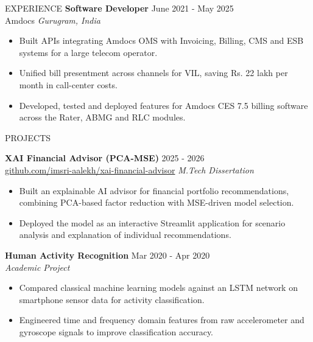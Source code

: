 \documentclass[a4paper,11pt]{resume-openfont}
\begin{document}
\begin{rSection}{EXPERIENCE}
\textbf{Software Developer} \hfill June 2021 - May 2025 \\
Amdocs \hfill \textit{Gurugram, India}
\begin{itemize}
    \item Built APIs integrating Amdocs OMS with Invoicing, Billing, CMS and ESB systems for a large telecom operator.
    \item Unified bill presentment across channels for VIL, saving Rs. 22 lakh per month in call-center costs.
    \item Developed, tested and deployed features for Amdocs CES 7.5 billing software across the Rater, ABMG and RLC modules.
\end{itemize}

\end{rSection}

\begin{rSection}{PROJECTS}

\textbf{XAI Financial Advisor (PCA-MSE)} \hfill 2025 - 2026 \\
\href{https://github.com/imsri-aalekh/xai-financial-advisor}{github.com/imsri-aalekh/xai-financial-advisor} \hfill \textit{M.Tech Dissertation}
\begin{itemize}
    \item Built an explainable AI advisor for financial portfolio recommendations, combining PCA-based factor reduction with MSE-driven model selection.
    \item Deployed the model as an interactive Streamlit application for scenario analysis and explanation of individual recommendations.
\end{itemize}

\textbf{Human Activity Recognition} \hfill Mar 2020 - Apr 2020 \\
\textit{Academic Project}
\begin{itemize}
    \item Compared classical machine learning models against an LSTM network on smartphone sensor data for activity classification.
    \item Engineered time and frequency domain features from raw accelerometer and gyroscope signals to improve classification accuracy.
\end{itemize}

\end{rSection}
\end{document}
